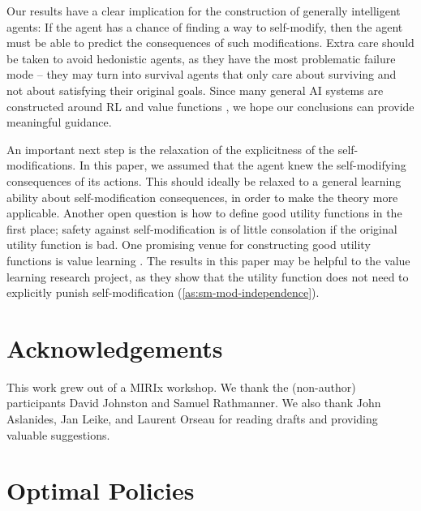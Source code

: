 \documentclass[a4paper]{article}
\theoremstyle{definition}
\theoremstyle{remark}
\begin{document}
Our results have a clear implication for the construction of generally
intelligent agents:
If the agent has a chance
of finding a way to self-modify, then the agent must be able to
predict the consequences of such modifications.
Extra care should be taken to avoid hedonistic agents, as they have
the most problematic failure mode --
they may turn into survival agents that only care about surviving
and not about satisfying their original goals. %
Since many general AI systems are constructed around RL and value functions
\citep{Mnih2015,Silver2016},
we hope our conclusions can provide meaningful guidance.

An important next step is the relaxation of the explicitness of the
self-modifications. In this paper, we assumed that the agent knew
the self-modifying consequences of its actions.
This should ideally be relaxed to a general learning ability about
self-modification consequences,
in order to make the theory more applicable.
Another open question is how to define good utility functions in the first
place; safety against self-modification is of little consolation if the
original utility function is bad.
One promising venue for constructing good utility functions
is value learning
\citep{Bostrom2014,Dewey2011,Everitt2016vrl,Soares2015vl}.
The results in this paper may be helpful to the value learning research project,
as they show that the utility function does not need to explicitly
punish self-modification (\cref{as:sm-mod-independence}).

\section*{Acknowledgements}
This work grew out of a MIRIx workshop.
We thank the (non-author) participants David Johnston and
Samuel Rathmanner.
We also thank John Aslanides, Jan Leike, and Laurent Orseau for reading
drafts and providing valuable suggestions.

\pagebreak




\pagebreak
\appendix

\section{Optimal Policies}
\label{sec:omitted-proofs}
\end{document}

